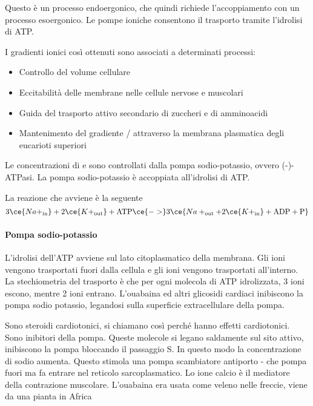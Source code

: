 Questo è un processo endoergonico, che quindi richiede l'accoppiamento con un processo esoergonico.
Le pompe ioniche consentono il trasporto tramite l'idrolisi di ATP.{}

I gradienti ionici così ottenuti sono associati a determinati processi:
\begin{itemize}
\item Controllo del volume cellulare
\item Eccitabilità delle membrane nelle cellule nervose e muscolari
\item Guida del trasporto attivo secondario di zuccheri e di amminoacidi
\item Mantenimento del gradiente / attraverso la membrana plasmatica degli eucarioti superiori
\end{itemize}

Le concentrazioni di  e  sono controllati dalla pompa sodio-potassio, ovvero (-)-ATPasi. La pompa sodio-potassio è accoppiata all'idrolisi di ATP.{}



La reazione che avviene è la seguente
\[
3 \ce{Na+_{\text{in}}} + 2 \ce{K+_{\text{out}}} + \text{ATP} \ce{->} 3 \ce {Na+_{\text{out}} + 2 \ce{K+_{\text{in}}} + \text{ADP} + \text{P}}
\]

\paragraph{Pompa sodio-potassio}


L'idrolisi dell'ATP avviene sul lato citoplasmatico della membrana. Gli ioni  vengono trasportati fuori dalla cellula e gli ioni  vengono trasportati all'interno. La stechiometria del trasporto è che per ogni molecola di ATP idrolizzata, 3 ioni  escono, mentre 2 ioni  entrano.
L'ouabaina ed altri glicosidi cardiaci inibiscono la pompa sodio potassio, legandosi sulla superficie extracellulare della pompa.

Sono steroidi cardiotonici, si chiamano così perché hanno effetti cardiotonici. Sono inibitori della pompa. Queste molecole si legano saldamente sul sito attivo, inibiscono la pompa bloccando il passaggio S. In questo modo la concentrazione di sodio aumenta. Questo stimola una pompa scambiatore antiporto - che pompa  fuori ma fa entrare  nel reticolo sarcoplasmatico. Lo ione calcio è il mediatore della contrazione muscolare.
L'ouabaina era usata come veleno nelle freccie, viene da una pianta in Africa

